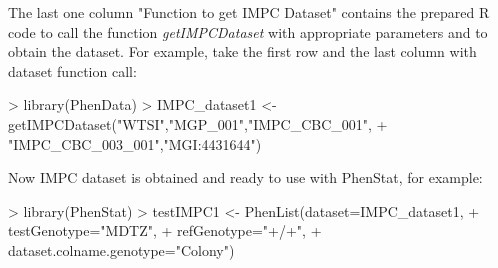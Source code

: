\documentclass[a4paper]{article}
\begin{document}
The last one column "Function to get IMPC Dataset" contains the prepared R code to call the function \textit{getIMPCDataset} with appropriate parameters and to obtain the dataset.
\newline\newline
For example, take the first row and the last column with dataset function call: 
\begin{Schunk}
\begin{Sinput}
> library(PhenData)
> IMPC_dataset1 <- getIMPCDataset("WTSI","MGP_001","IMPC_CBC_001",
+ "IMPC_CBC_003_001","MGI:4431644") 
\end{Sinput}
\end{Schunk}
Now IMPC dataset is obtained and ready to use with PhenStat, for example:
\begin{Schunk}
\begin{Sinput}
> library(PhenStat)
> testIMPC1 <- PhenList(dataset=IMPC_dataset1,
+ testGenotype="MDTZ",
+ refGenotype="+/+",
+ dataset.colname.genotype="Colony") 
\end{Sinput}
\end{Schunk}
\end{document}
